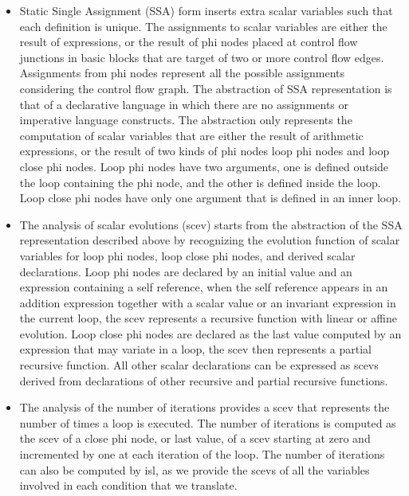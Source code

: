 \documentclass{sig-alternate}
\begin{document}
\begin{itemize}
\item Static Single Assignment (SSA) form \cite{cytron} inserts extra scalar
  variables such that each definition is unique.  The assignments to scalar
  variables are either the result of expressions, or the result of phi nodes
  placed at control flow junctions in basic blocks that are target of two or
  more control flow edges.  Assignments from phi nodes represent all the
  possible assignments considering the control flow graph. The abstraction of
  SSA representation is that of a declarative language \cite{spop2007} in which
  there are no assignments or imperative language constructs.  The abstraction
  only represents the computation of scalar variables that are either the result
  of arithmetic expressions, or the result of two kinds of phi nodes loop phi
  nodes and loop close phi nodes. Loop phi nodes have two arguments, one is
  defined outside the loop containing the phi node, and the other is defined
  inside the loop.  Loop close phi nodes have only one argument that is defined
  in an inner loop.

\item The analysis of scalar evolutions (scev) \cite{scev} starts from the
  abstraction of the SSA representation described above by recognizing the
  evolution function of scalar variables for loop phi nodes, loop close phi
  nodes, and derived scalar declarations.  Loop phi nodes are declared by an
  initial value and an expression containing a self reference, when the self
  reference appears in an addition expression together with a scalar value or an
  invariant expression in the current loop, the scev represents a recursive
  function with linear or affine evolution.  Loop close phi nodes are declared
  as the last value computed by an expression that may variate in a loop, the
  scev then represents a partial recursive function.  All other scalar
  declarations can be expressed as scevs derived from declarations of other
  recursive and partial recursive functions.

\item The analysis of the number of iterations \cite{scev} provides a scev that
  represents the number of times a loop is executed.  The number of iterations
  is computed as the scev of a close phi node, or last value, of a scev starting
  at zero and incremented by one at each iteration of the loop.  The number of
  iterations can also be computed by isl, as we provide the scevs of all the
  variables involved in each condition that we translate.


\end{itemize}
\end{document}

